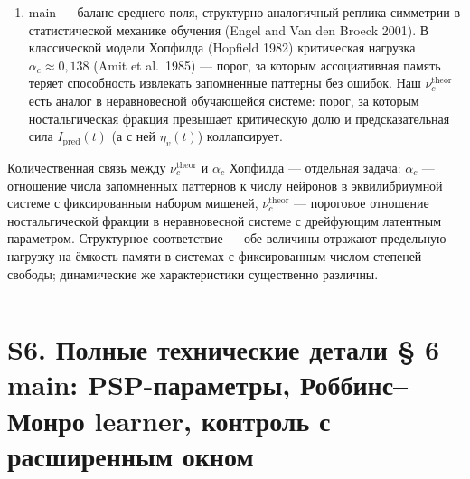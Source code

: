 \documentclass[pdflatex,sn-mathphys-ay]{sn-jnl}
\providecommand{\tightlist}{\setlength{\itemsep}{0pt}\setlength{\parskip}{0pt}}
\begin{document}
\begin{enumerate}

\def\labelenumi{(\arabic{enumi})}

\setcounter{enumi}{10}

\tightlist

\item

  main --- баланс среднего поля, структурно аналогичный реплика-симметрии в статистической механике обучения (Engel and Van den Broeck 2001). В классической модели Хопфилда (Hopfield 1982) критическая нагрузка \(\alpha_c \approx 0{,}138\) (Amit et al.~1985) --- порог, за которым ассоциативная память теряет способность извлекать запомненные паттерны без ошибок. Наш \(\nu_c^{\text{theor}}\) есть аналог в неравновесной обучающейся системе: порог, за которым ностальгическая фракция превышает критическую долю и предсказательная сила \(I_{\text{pred}}(t)\) (а с ней \(\eta_v(t)\)) коллапсирует.

\end{enumerate}



Количественная связь между \(\nu_c^{\text{theor}}\) и \(\alpha_c\) Хопфилда --- отдельная задача: \(\alpha_c\) --- отношение числа запомненных паттернов к числу нейронов в эквилибриумной системе с фиксированным набором мишеней, \(\nu_c^{\text{theor}}\) --- пороговое отношение ностальгической фракции в неравновесной системе с дрейфующим латентным параметром. Структурное соответствие --- обе величины отражают предельную нагрузку на ёмкость памяти в системах с фиксированным числом степеней свободы; динамические же характеристики существенно различны.



\begin{center}\rule{0.5\linewidth}{0.5pt}\end{center}



\section*{S6. Полные технические детали § 6 main: PSP-параметры, Роббинс--Монро learner, контроль с расширенным окном}\label{s6.-ux43fux43eux43bux43dux44bux435-ux442ux435ux445ux43dux438ux447ux435ux441ux43aux438ux435-ux434ux435ux442ux430ux43bux438-6-main-psp-ux43fux430ux440ux430ux43cux435ux442ux440ux44b-ux440ux43eux431ux431ux438ux43dux441ux43cux43eux43dux440ux43e-learner-ux43aux43eux43dux442ux440ux43eux43bux44c-ux441-ux440ux430ux441ux448ux438ux440ux435ux43dux43dux44bux43c-ux43eux43aux43dux43eux43c}
\end{document}
